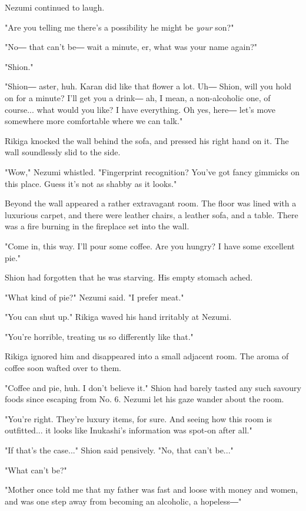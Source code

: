 Nezumi continued to laugh.

"Are you telling me there's a possibility he might be \emph{your} son?"

"No― that can't be― wait a minute, er, what was your name again?"

"Shion."

"Shion― aster, huh. Karan did like that flower a lot. Uh― Shion, will
you hold on for a minute? I'll get you a drink― ah, I mean, a
non-alcoholic one, of course... what would you like? I have everything.
Oh yes, here― let's move somewhere more comfortable where we can talk."

Rikiga knocked the wall behind the sofa, and pressed his right hand on
it. The wall soundlessly slid to the side.

"Wow," Nezumi whistled. "Fingerprint recognition? You've got fancy
gimmicks on this place. Guess it's not as shabby as it looks."

Beyond the wall appeared a rather extravagant room. The floor was lined
with a luxurious carpet, and there were leather chairs, a leather sofa,
and a table. There was a fire burning in the fireplace set into the
wall.

"Come in, this way. I'll pour some coffee. Are you hungry? I have some
excellent pie."

Shion had forgotten that he was starving. His empty stomach ached.

"What kind of pie?" Nezumi said. "I prefer meat."

"You can shut up." Rikiga waved his hand irritably at Nezumi.

"You're horrible, treating us so differently like that."

Rikiga ignored him and disappeared into a small adjacent room. The aroma
of coffee soon wafted over to them.

"Coffee and pie, huh. I don't believe it." Shion had barely tasted any
such savoury foods since escaping from No. 6. Nezumi let his gaze wander
about the room.

"You're right. They're luxury items, for sure. And seeing how this room
is outfitted... it looks like Inukashi's information was spot-on after
all."

"If that's the case..." Shion said pensively. "No, that can't be..."

"What can't be?"

"Mother once told me that my father was fast and loose with money and
women, and was one step away from becoming an alcoholic, a hopeless―"

